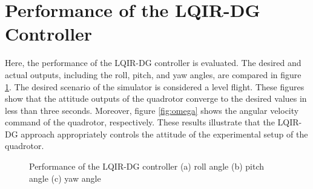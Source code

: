 \documentclass[3p,times]{elsarticle}
\begin{document}
\section{Performance of the LQIR-DG Controller}
Here, the performance of the LQIR-DG controller is evaluated. The desired and actual outputs, including the roll, pitch, and yaw angles, are compared in figure \ref{fig:result}. The desired scenario of the simulator is considered a level flight. These figures show that the attitude outputs of the quadrotor converge to the desired values in less than three seconds. Moreover, figure \ref{fig:omega} shows the angular velocity command of the quadrotor, 
respectively. These results illustrate that the LQIR-DG approach appropriately controls the attitude of the experimental setup of the quadrotor.


\begin{figure}[!h]
	\centering
	\hfil
	\caption{Performance of the LQIR-DG controller (a) roll angle (b) pitch angle (c) yaw angle}
	\label{fig:result}
\end{figure}
\end{document}
